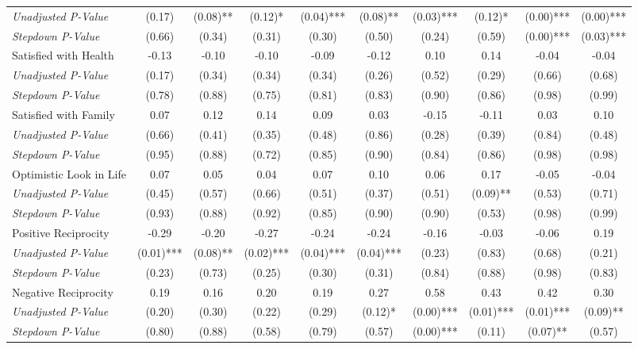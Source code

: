 \begin{tabular}{l c c c c c c c c c}
\quad \textit{Unadjusted P-Value} & (0.17) & (0.08)** & (0.12)* & (0.04)*** & (0.08)** & (0.03)*** & (0.12)* & (0.00)*** & (0.00)*** \\
\quad \textit{Stepdown P-Value} & (0.66) & (0.34) & (0.31) & (0.30) & (0.50) & (0.24) & (0.59) & (0.00)*** & (0.03)*** \\
Satisfied with Health & -0.13 & -0.10 & -0.10 & -0.09 & -0.12 & 0.10 & 0.14 & -0.04 & -0.04 \\
\quad \textit{Unadjusted P-Value} & (0.17) & (0.34) & (0.34) & (0.34) & (0.26) & (0.52) & (0.29) & (0.66) & (0.68) \\
\quad \textit{Stepdown P-Value} & (0.78) & (0.88) & (0.75) & (0.81) & (0.83) & (0.90) & (0.86) & (0.98) & (0.99) \\
Satisfied with Family & 0.07 & 0.12 & 0.14 & 0.09 & 0.03 & -0.15 & -0.11 & 0.03 & 0.10 \\
\quad \textit{Unadjusted P-Value} & (0.66) & (0.41) & (0.35) & (0.48) & (0.86) & (0.28) & (0.39) & (0.84) & (0.48) \\
\quad \textit{Stepdown P-Value} & (0.95) & (0.88) & (0.72) & (0.85) & (0.90) & (0.84) & (0.86) & (0.98) & (0.98) \\
Optimistic Look in Life & 0.07 & 0.05 & 0.04 & 0.07 & 0.10 & 0.06 & 0.17 & -0.05 & -0.04 \\
\quad \textit{Unadjusted P-Value} & (0.45) & (0.57) & (0.66) & (0.51) & (0.37) & (0.51) & (0.09)** & (0.53) & (0.71) \\
\quad \textit{Stepdown P-Value} & (0.93) & (0.88) & (0.92) & (0.85) & (0.90) & (0.90) & (0.53) & (0.98) & (0.99) \\
Positive Reciprocity & -0.29 & -0.20 & -0.27 & -0.24 & -0.24 & -0.16 & -0.03 & -0.06 & 0.19 \\
\quad \textit{Unadjusted P-Value} & (0.01)*** & (0.08)** & (0.02)*** & (0.04)*** & (0.04)*** & (0.23) & (0.83) & (0.68) & (0.21) \\
\quad \textit{Stepdown P-Value} & (0.23) & (0.73) & (0.25) & (0.30) & (0.31) & (0.84) & (0.88) & (0.98) & (0.83) \\
Negative Reciprocity & 0.19 & 0.16 & 0.20 & 0.19 & 0.27 & 0.58 & 0.43 & 0.42 & 0.30 \\
\quad \textit{Unadjusted P-Value} & (0.20) & (0.30) & (0.22) & (0.29) & (0.12)* & (0.00)*** & (0.01)*** & (0.01)*** & (0.09)** \\
\quad \textit{Stepdown P-Value} & (0.80) & (0.88) & (0.58) & (0.79) & (0.57) & (0.00)*** & (0.11) & (0.07)** & (0.57) \\
\bottomrule
\end{tabular}
